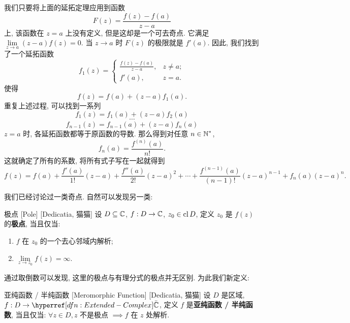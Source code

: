         \begin{prf}
            我们只要将上面的延拓定理应用到函数
            \[F(z)=\frac{f(z)-f(a)}{z-a}\]
            上, 该函数在 \(z=a\) 上没有定义, 但是这却是一个可去奇点. 它满足 \(\lim\limits_{z\to a}(z-a)f(z)=0\). 当 \(z\to a\) 时 \(F(z)\) 的极限就是 \(f'(a)\). 因此, 我们找到了一个延拓函数
            \[f_1(z)=\begin{cases}
                \frac{f(z)-f(a)}{z-a}, & z\neq a;\\
                f'(a), &z=a.
            \end{cases}\]
            使得
            \[f(z)=f(a)+(z-a)f_1(a).\]
            重复上述过程, 可以找到一系列
            \[f_1(z)=f_1(a)+(z-a)f_2(a)\]
            \[\cdots\]
            \[f_{n-1}(z)=f_{n-1}(a)+(z-a)f_n(a)\]
            \(z=a\) 时, 各延拓函数都等于原函数的导数. 那么得到对任意 \(n\in\operatorname{\mathbb{N}}^*\),
            \[f_n(a)=\frac{f^{(n)}(a)}{n!}.\]
            这就确定了所有的系数, 将所有式子写在一起就得到
            \[f(z)=f(a)+\frac{f'(a)}{1!}(z-a)+\frac{f''(a)}{2!}(z-a)^2+\cdots+\frac{f^{(n-1)}(a)}{(n-1)!}(z-a)^{n-1}+f_n(a)(z-a)^n.\]
        \end{prf}

        我们已经讨论过一类奇点. 自然可以发现另一类: 

        \begin{dfn}
            [Pole]
            {极点}
            [Pole]
            [Dedicatia, 猫猫]
            设 \(D\subseteq\operatorname{\mathbb{C}}\), \(f:D\to\operatorname{\mathbb{C}}\), \(z_0\in\operatorname{cl} D\), 定义 \(z_0\) 是 \(f(z)\) 的\textbf{极点}, 当且仅当: 
            \begin{enumerate}
                \item \(f\) 在 \(z_0\) 的一个去心邻域内解析; 
                \item \(\lim\limits_{z \to z_0} f(z) = \infty\). 
            \end{enumerate}
        \end{dfn}

        通过取倒数可以发现, 这里的极点与有理分式的极点并无区别. 为此我们新定义: 

        \begin{dfn}
            {亚纯函数 / 半纯函数}
            [Meromorphic Function]
            [Dedicatia, 猫猫]
            设 \(D\) 是区域, \(f:D\to\barC\), 定义 \(f\) 是\textbf{亚纯函数 / 半纯函数}, 当且仅当: \(\forall z\in D, z\) 不是极点 \(\implies f\) 在 \(z\) 处解析. 
        \end{dfn}
        
